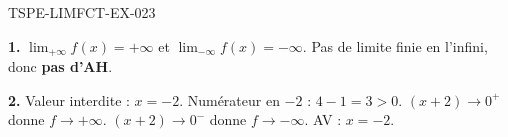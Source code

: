 \begin{corrige}{TSPE-LIMFCT-EX-023}

\textbf{1.} $\lim_{+\infty} f(x) = +\infty$ et $\lim_{-\infty} f(x) = -\infty$. Pas de limite finie en l'infini, donc \textbf{pas d'AH}.

\textbf{2.} Valeur interdite : $x = -2$. Numérateur en $-2$ : $4-1 = 3 > 0$. $(x+2) \to 0^+$ donne $f \to +\infty$. $(x+2) \to 0^-$ donne $f \to -\infty$. AV : $x = -2$.

\end{corrige}
